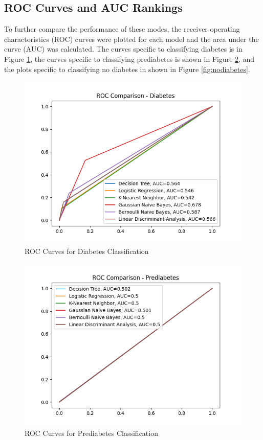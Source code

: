 \documentclass[journal]{IEEEtran}
\begin{document}
\subsection{ROC Curves and AUC Rankings}

To further compare the performance of these modes, the receiver operating charactoristics (ROC) curves were plotted for each model and the area under the curve (AUC) was calculated. The curves specific to classifying diabetes is in Figure \ref{fig:diabetes}, the curves specific to classifying prediabetes is shown in Figure \ref{fig:prediabetes}, and the plots specific to classifying no diabetes in shown in Figure \ref{fig:nodiabetes}.

\begin{figure}[h!]
    \includegraphics[scale=0.5]{ROC Comparison - Diabetes.png}
    \centering
    \caption{ROC Curves for Diabetes Classification}
    \label{fig:diabetes}
\end{figure}

\begin{figure}[h!]
    \includegraphics[scale=0.5]{ROC Comparison - Prediabetes.png}
    \centering
    \caption{ROC Curves for Prediabetes Classification}
    \label{fig:prediabetes}
\end{figure}
\end{document}

